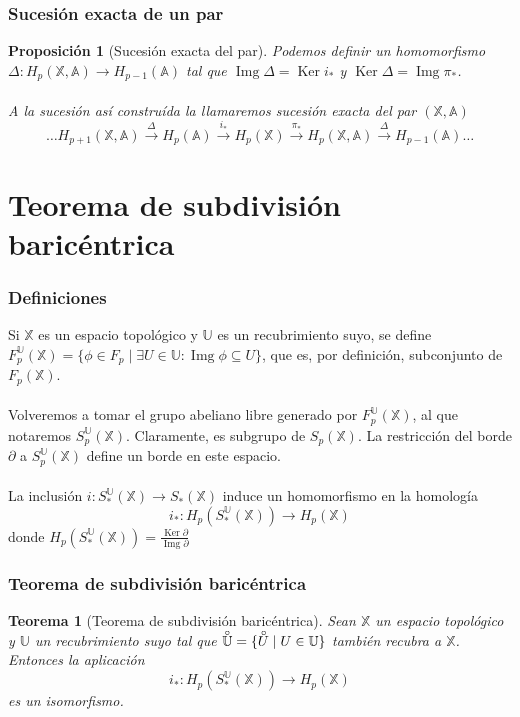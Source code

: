 \documentclass{beamer}
\def\X{{\mathbb X}}
\def\A{{\mathbb A}}
\def\U{{\mathbb U}}
\DeclareMathOperator{\Ker}{Ker}
\DeclareMathOperator{\Img}{Img}
\newcommand{\interior}[1]{\accentset{\smash{\raisebox{-0.12ex}{$\scriptstyle\circ$}}}{#1}\rule{0pt}{2.3ex}}
\theoremstyle{theorem}
\newtheorem{mytheorem}{Teorema}
\newtheorem{myproposition}{Proposición}
\begin{document}

\begin{frame}
  \frametitle{Sucesión exacta de un par}
  \begin{myproposition}[Sucesión exacta del par]
    Podemos definir un homomorfismo $\Delta \colon H_p(\X, \A) \to H_{p-1}(\A)$ tal que
    $\Img \Delta = \Ker i_*$ y $\Ker \Delta = \Img \pi_*$. \\~\\

    A la sucesión así construída la llamaremos sucesión exacta del par $(\X, \A)$
    \[ \dots H_{p+1}(\X, \A) \xrightarrow{\Delta} H_p(\A) \xrightarrow{i_*} H_p(\X) \xrightarrow{\pi_*} H_p(\X, \A) \xrightarrow{\Delta} H_{p-1}(\A) \dots \]
  \end{myproposition}

\end{frame}


\section{Teorema de subdivisión baricéntrica}

\begin{frame}
  \frametitle{Definiciones}
  Si $\X$ es un espacio topológico y $\U$ es un recubrimiento suyo, se define
  $F_p^\U(\X) = \{ \phi \in F_p \mid \exists U \in \U \colon \Img \phi \subseteq U \}$,
  que es, por definición, subconjunto de $F_p(\X)$. \\~\\

  Volveremos a tomar el grupo abeliano libre generado por $F_p^\U(\X)$, al que notaremos $S_p^\U(\X)$.
  Claramente, es subgrupo de $S_p(\X)$. La restricción del borde $\partial$ a $S_p^\U(\X)$ define un borde en este espacio.  \\~\\

  La inclusión $i \colon S_*^\U(\X) \to S_*(\X)$ induce un homomorfismo en la homología
  \[ i_* \colon H_p(S_*^\U(\X)) \to H_p(\X) \]
  donde $H_p(S_*^\U(\X)) = \frac{\Ker \partial}{\Img \partial}$


\end{frame}


\begin{frame}
  \frametitle{Teorema de subdivisión baricéntrica}

  \begin{mytheorem}[Teorema de subdivisión baricéntrica]
    Sean $\X$ un espacio topológico y $\U$ un recubrimiento suyo tal que $\interior{\U} = \{\interior{U} \mid U \in \U\}$
    también recubra a $\X$. Entonces la aplicación \[i_* \colon H_p(S_*^\U(\X)) \to H_p(\X)\] es un isomorfismo.
  \end{mytheorem}

\end{frame}
\end{document}
